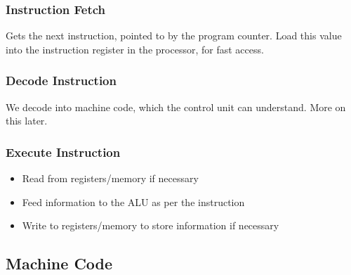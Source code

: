 \subsubsection{Instruction Fetch}

Gets the next instruction, pointed to by the program counter. Load this value into the instruction register in the processor, for fast access.

\subsubsection{Decode Instruction}

We decode into machine code, which the control unit can understand. More on this later.

\subsubsection{Execute Instruction}

\begin{itemize}
\item Read from registers/memory if necessary
\item Feed information to the ALU as per the instruction
\item Write to registers/memory to store information if necessary
\end{itemize}

\subsection{Machine Code}

